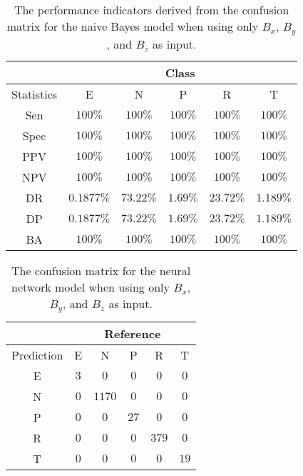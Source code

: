 \begin{table}[!ht]
	\centering
	\begin{tabular}{|c|c|c|c|c|c|}
		\hline
		 & \multicolumn{5}{c|}{Class} \\ \hline
		Statistics & E & N & P & R & T \\ \hline
		Sen & $100\%$ & $100\%$ & $100\%$ & $100\%$ & $100\%$ \\ \hline
		Spec & $100\%$ & $100\%$ & $100\%$ & $100\%$ & $100\%$ \\ \hline
		PPV & $100\%$ & $100\%$ & $100\%$ & $100\%$ & $100\%$ \\ \hline
		NPV & $100\%$ & $100\%$ & $100\%$ & $100\%$ & $100\%$ \\ \hline
		DR & $0.1877\%$ & $73.22\%$ & $1.69\%$ & $23.72\%$ & $1.189\%$ \\ \hline
		DP & $0.1877\%$ & $73.22\%$ & $1.69\%$ & $23.72\%$ & $1.189\%$ \\ \hline
		BA & $100\%$ & $100\%$ & $100\%$ & $100\%$ & $100\%$ \\ \hline
	\end{tabular}
	\caption{The performance indicators derived from the confusion matrix for the naive Bayes model when using only $B_{x}$, $B_{y}$, and $B_{z}$ as input.}
	\label{tab:cs:reverse:coord:nb}
\end{table}

\begin{table}[!ht]
	\centering
	\begin{tabular}{|c|c|c|c|c|c|}
		\hline
		 & \multicolumn{5}{|c|}{Reference} \\ \hline
		 Prediction & E & N & P & R & T \\ \hline
		 E & $3$ & $0$ & $0$ & $0$ & $0$ \\ \hline
		 N & $0$ & $1170$ & $0$ & $0$ & $0$ \\ \hline
		 P & $0$ & $0$ & $27$ & $0$ & $0$ \\ \hline
		 R & $0$ & $0$ & $0$ & $379$ & $0$ \\ \hline
		 T & $0$ & $0$ & $0$ & $0$ & $19$ \\ \hline
	\end{tabular}
	\caption{The confusion matrix for the neural network model when using only $B_{x}$, $B_{y}$, and $B_{z}$ as input.}
	\label{tab:cm:coord:nnet}
\end{table}

